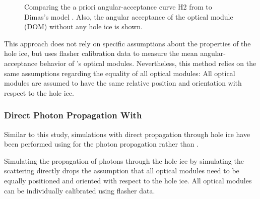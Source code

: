 \begin{figure}[htbp]
  \caption{Comparing the a priori angular-acceptance curve H2 from \cite{icepaper} to Dimas's model \cite{flasherdataderivedicemodels}. Also, the angular acceptance of the optical module (DOM) without any hole ice is shown.}
  \label{fig:Vohn9Oov}
\end{figure}

This approach does not rely on specific assumptions about the properties of the hole ice, but uses flasher calibration data to measure the mean angular-acceptance behavior of \icecube's optical modules.
Nevertheless, this method relies on the same assumptions regarding the equality of all optical modules: All optical modules are assumed to have the same relative position and orientation with respect to the hole ice.

\subsubsection{Direct Photon Propagation With \ppc}
\label{sec:direct_photon_propagation_with_ppc}\label{sec:pocam}

Similar to this study, simulations with direct propagation through hole ice have been performed using \ppc for the photon propagation rather than \clsim. \cite{martinspicehddard, martindardupdate, pocam, icrc17pocam, ppcpaper}


Simulating the propagation of photons through the hole ice by simulating the scattering directly drops the assumption that all optical modules need to be equally positioned and oriented with respect to the hole ice. All optical modules can be individually calibrated using flasher data. \cite{martinspicehddard}

